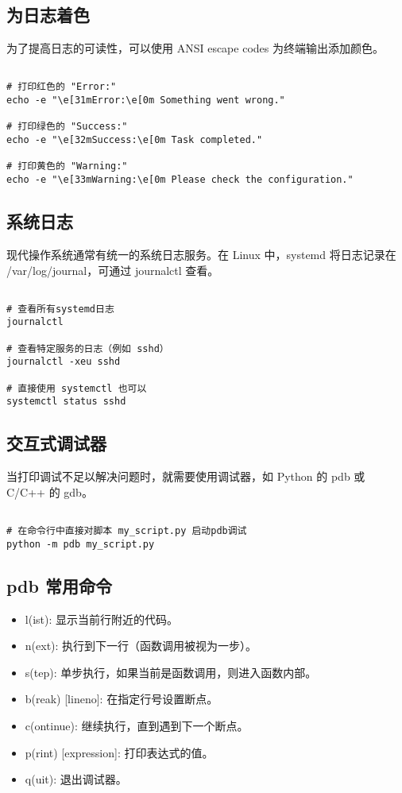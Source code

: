 \documentclass[UTF8]{gyh}
\begin{document}
\subsection{为日志着色}
为了提高日志的可读性，可以使用 ANSI escape codes 为终端输出添加颜色。

\begin{lstlisting}

# 打印红色的 "Error:"
echo -e "\e[31mError:\e[0m Something went wrong."

# 打印绿色的 "Success:"
echo -e "\e[32mSuccess:\e[0m Task completed."

# 打印黄色的 "Warning:"
echo -e "\e[33mWarning:\e[0m Please check the configuration."
\end{lstlisting}

\subsection{系统日志}
现代操作系统通常有统一的系统日志服务。在 Linux 中，systemd 将日志记录在 /var/log/journal，可通过 journalctl 查看。

\begin{lstlisting}

# 查看所有systemd日志
journalctl

# 查看特定服务的日志（例如 sshd）
journalctl -xeu sshd

# 直接使用 systemctl 也可以
systemctl status sshd
\end{lstlisting}



\subsection{交互式调试器}
当打印调试不足以解决问题时，就需要使用调试器，如 Python 的 pdb 或 C/C++ 的 gdb。

\begin{lstlisting}

# 在命令行中直接对脚本 my_script.py 启动pdb调试
python -m pdb my_script.py
\end{lstlisting}

\subsection{pdb 常用命令}
\begin{itemize}
\item l(ist): 显示当前行附近的代码。
\item n(ext): 执行到下一行（函数调用被视为一步）。
\item s(tep): 单步执行，如果当前是函数调用，则进入函数内部。
\item b(reak) [lineno]: 在指定行号设置断点。
\item c(ontinue): 继续执行，直到遇到下一个断点。
\item p(rint) [expression]: 打印表达式的值。
\item q(uit): 退出调试器。
\end{itemize}
\end{document}
